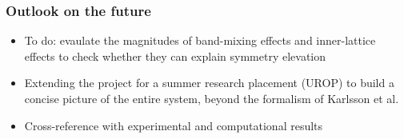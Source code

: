 \documentclass[english]{beamer}
\begin{document}
  \begin{frame}
  	\frametitle{Outlook on the future}
  	
  	\begin{itemize}
  		\item To do: evaulate the magnitudes of band-mixing effects and inner-lattice effects to check whether they can explain symmetry elevation
  		\item Extending the project for a summer research placement (UROP) to build a concise picture of the entire system, beyond the formalism of Karlsson et al.
  		\item Cross-reference with experimental and computational results
  	\end{itemize}
  
  
  \end{frame}
  
\end{document}
